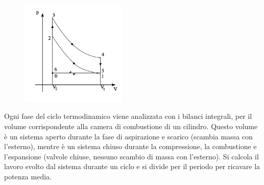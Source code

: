 \begin{figure}[h]
 \centering
 \includegraphics[width=0.45\textwidth]{./fig/otto_cycle}
\end{figure}


%
\sol

\partone
Ogni fase del ciclo termodinamico viene analizzata con i bilanci integrali, per il volume corrispondente alla camera di combustione di un cilindro. Questo volume è un sistema aperto durante la fase di aspirazione e scarico (scambia massa con l'esterno), mentre è un sistema chiuso durante la compressione, la combustione e l'espansione (valvole chiuse, nessuno scambio di massa con l'esterno). Si calcola il lavoro svolto dal sistema durante un ciclo e si divide per il periodo per ricavare la potenza media. 

